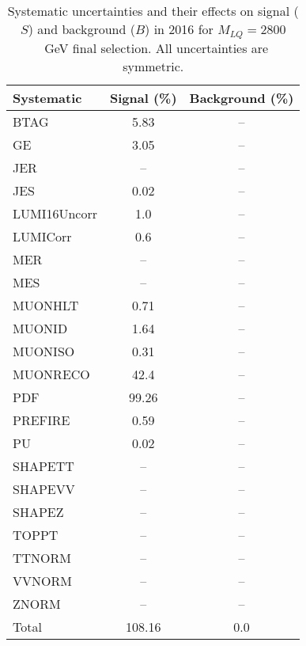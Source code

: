 \begin{table}[htbp]
\begin{center}
\caption{Systematic uncertainties and their effects on signal ($S$) and background ($B$) in 2016 for $M_{LQ}=2800$~GeV final selection. All uncertainties are symmetric.}
\begin{tabular}{lcc}
\hline\hline
Systematic & Signal (\%) & Background (\%) \\ \hline 
BTAG & 5.83 & --\\ 
GE & 3.05 & --\\ 
JER & -- & --\\ 
JES & 0.02 & --\\ 
LUMI16Uncorr & 1.0 & --\\ 
LUMICorr & 0.6 & --\\ 
MER & -- & --\\ 
MES & -- & --\\ 
MUONHLT & 0.71 & --\\ 
MUONID & 1.64 & --\\ 
MUONISO & 0.31 & --\\ 
MUONRECO & 42.4 & --\\ 
PDF & 99.26 & --\\ 
PREFIRE & 0.59 & --\\ 
PU & 0.02 & --\\ 
SHAPETT & -- & --\\ 
SHAPEVV & -- & --\\ 
SHAPEZ & -- & --\\ 
TOPPT & -- & --\\ 
TTNORM & -- & --\\ 
VVNORM & -- & --\\ 
ZNORM & -- & --\\ 
Total & 108.16 & 0.0\\ \hline \hline
\end{tabular}
\label{tab:SysUncertainties_uujj_2800}
\end{center}
\end{table}


